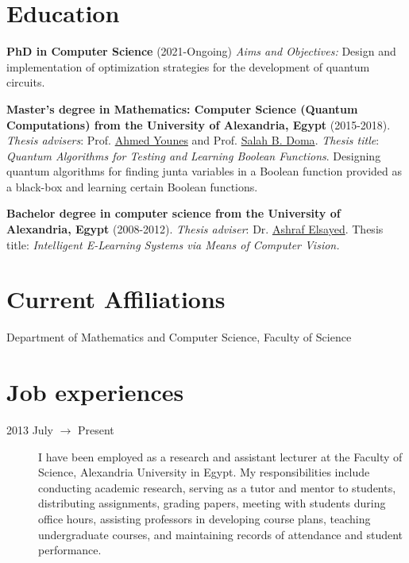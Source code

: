 \documentclass[margin,line]{resume}
\begin{document}
\begin{resume}
	\section{Education\mysidestyle}\vspace{1mm}
	\textbf{PhD in Computer Science} (2021-Ongoing)
	\emph{Aims and Objectives:} Design and implementation of optimization strategies for the development of quantum circuits.

	\textbf{Master's degree in Mathematics: Computer Science (Quantum Computations) from the University of Alexandria, Egypt} (2015-2018).
	\emph{Thesis advisers}: Prof.  \href{https://scholar.google.com.eg/citations?user=CZz2XFIAAAAJ&hl=en}{Ahmed Younes} and Prof. \href{https://scholar.google.com.eg/citations?hl=en&user=YFeMsegAAAAJ&view_op=list_works&sortby=pubdate}{Salah B. Doma}.
	\emph{Thesis title}: \textit{Quantum Algorithms for Testing and Learning Boolean Functions}. Designing quantum algorithms for finding junta variables in a Boolean function provided as a black-box and learning certain Boolean functions.

	\textbf{Bachelor degree in computer science from the University of Alexandria, Egypt}
	(2008-2012).  \emph{Thesis adviser}: Dr. \href{https://scholar.google.com.eg/citations?hl=en&user=G9tQkdIAAAAJ&view_op=list_works&sortby=pubdate}{Ashraf Elsayed}.
	Thesis title: \textit{Intelligent E-Learning Systems via Means of Computer Vision.}


	\section{Current Affiliations\mysidestyle}\vspace{1mm}
	\begin{description}
		\item[Department of Mathematics and Computer Science, Faculty of Science]
	\end{description}


	\section{Job experiences\mysidestyle}\vspace{1mm}
	\begin{description}



		\item[2013 July $\rightarrow$ Present]  I have been employed as a research and assistant lecturer at the Faculty of Science, Alexandria University in Egypt. My responsibilities include conducting academic research, serving as a tutor and mentor to students, distributing assignments, grading papers, meeting with students during office hours, assisting professors in developing course plans, teaching undergraduate courses, and maintaining records of attendance and student performance.


\end{description}
\end{resume}
\end{document}

